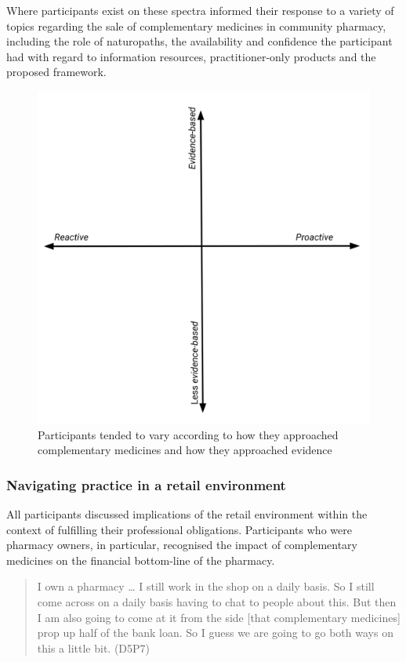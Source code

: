 \documentclass[11pt,a4paper]{article}
\begin{document}
Where participants exist on these spectra informed their response to a
variety of topics regarding the sale of complementary medicines in
community pharmacy, including the role of naturopaths, the availability
and confidence the participant had with regard to information resources,
practitioner-only products and the proposed framework.

\begin{figure}
\centering
\includegraphics{files/CMEthics_context3.png}
\caption{Participants tended to vary according to how they approached
complementary medicines and how they approached evidence
\label{context3}}
\end{figure}

\subsubsection{Navigating practice in a retail
environment}\label{navigating-practice-in-a-retail-environment}

All participants discussed implications of the retail environment within
the context of fulfilling their professional obligations. Participants
who were pharmacy owners, in particular, recognised the impact of
complementary medicines on the financial bottom-line of the pharmacy.

\begin{quote}
I own a pharmacy \ldots{} I still work in the shop on a daily basis. So
I still come across on a daily basis having to chat to people about
this. But then I am also going to come at it from the side {[}that
complementary medicines{]} prop up half of the bank loan. So I guess we
are going to go both ways on this a little bit. (D5P7)
\end{quote}
\end{document}
